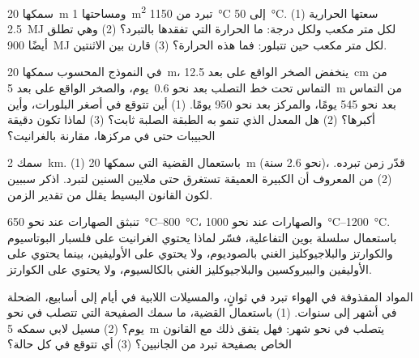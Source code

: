 \begin{exercise}[$\star\star$]\label{exo:g11:igneous-rocks:11}
 سمكها \qty{20}{m} ومساحتها \qty{1}{m^2} تبرد من
\qty{1150}{\degreeCelsius} إلى \qty{50}{\degreeCelsius}. (1) سعتها
الحرارية \qty{2.5}{MJ} لكل متر مكعب ولكل درجة: ما الحرارة التي
تفقدها بالتبرد؟ (2) وهي تطلق أيضًا \qty{900}{MJ} لكل متر مكعب حين
تتبلور: فما هذه الحرارة؟ (3) قارن بين الاثنتين.
\end{exercise}

\begin{exercise}[$\star\star\star$]\label{exo:g11:igneous-rocks:12}
في النموذج المحسوب  سمكها \qty{20}{m}، ينخفض الصخر الواقع على بعد
\qty{12.5}{cm} من التماس تحت خط التصلب بعد نحو
\num{0.6}~يوم، والصخر الواقع على بعد \qty{5}{m} من التماس بعد نحو 545 يومًا،
والمركز بعد نحو 950 يومًا. (1) أين تتوقع في 
أصغر البلورات، وأين أكبرها؟ (2) هل المعدل الذي تنمو به
الطبقة الصلبة ثابت؟ (3) لماذا تكون  دقيقة الحبيبات حتى في
مركزها، مقارنة بالغرانيت؟
\end{exercise}

\begin{exercise}[$\star\star\star$]\label{exo:g11:igneous-rocks:13}
سمك  \qty{2}{km}. (1) باستعمال القضية
 التي سمكها \qty{20}{m} (نحو 2.6 سنة)، قدّر زمن تبرده. (2) من المعروف أن  الكبيرة العميقة تستغرق حتى ملايين السنين لتبرد. اذكر سببين
لكون القانون البسيط يقلل من تقدير الزمن.
\end{exercise}

\begin{exercise}[$\star\star\star$]\label{exo:g11:igneous-rocks:14}
تنبثق الصهارات  عند نحو \qtyrange{650}{800}{\degreeCelsius}، والصهارات
 عند نحو \qtyrange{1000}{1200}{\degreeCelsius}. باستعمال سلسلة بوين
التفاعلية، فسّر لماذا يحتوي الغرانيت على فلسبار البوتاسيوم والكوارتز
والبلاجيوكليز الغني بالصوديوم، ولا يحتوي على الأوليفين، بينما يحتوي  على الأوليفين
والبيروكسين والبلاجيوكليز الغني بالكالسيوم، ولا يحتوي على الكوارتز.
\end{exercise}

\begin{exercise}[$\star\star\star$]\label{exo:g11:igneous-rocks:15}
المواد المقذوفة في الهواء تبرد في ثوانٍ، والمسيلات اللابية في أيام إلى أسابيع،
 الضحلة في أشهر إلى سنوات. (1) باستعمال القضية، ما
سمك الصفيحة التي تتصلب في نحو يوم؟ (2) مسيل لابي سمكه \qty{5}{m}
يتصلب في نحو شهر: فهل يتفق ذلك مع القانون الخاص بصفيحة
تبرد من الجانبين؟ (3) أي  تتوقع في كل حالة؟
\end{exercise}

